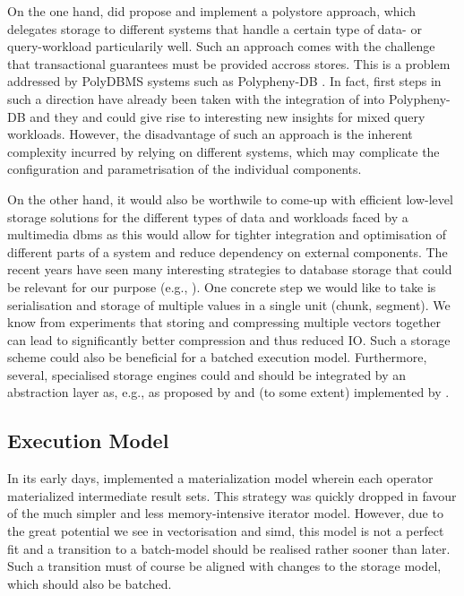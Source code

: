 On the one hand, \cite{Giangreco:2018Database} did propose and implement a polystore approach, which delegates storage to different systems that handle a certain type of data- or query-workload particularily well. Such an approach comes with the challenge that transactional guarantees must be provided accross stores. This is a problem addressed by PolyDBMS systems such as Polypheny-DB \cite{Vogt:2018Polypheny,Vogt:2020Polypheny}. In fact, first steps in such a direction have already been taken with the integration of \cottontail into Polypheny-DB and they and could give rise to interesting new insights for mixed query workloads. However, the disadvantage of such an approach is the inherent complexity incurred by relying on different systems, which may complicate the configuration and parametrisation of the individual components.

On the other hand, it would also be worthwile to come-up with efficient low-level storage solutions for the different types of data and workloads faced by a multimedia \acrshort{dbms} as this would allow for tighter integration and optimisation of different parts of a system and reduce dependency on external components. The recent years have seen many interesting strategies to database storage that could be relevant for our purpose (e.g., \cite{Idreos:2012MonetDB,Sears:2012Blsm}). One concrete step we would like to take is serialisation and storage of multiple values in a single unit (chunk, segment). We know from experiments that storing and compressing multiple vectors together can lead to significantly better compression and thus reduced IO. Such a storage scheme could also be beneficial for a batched execution model. Furthermore, several, specialised storage engines could and should be integrated by an abstraction layer as, e.g., as proposed by \cite{Dittrich:2011Toward,Alagiannis:2014H2O} and (to some extent) implemented by \cottontail{}.


\subsection{Execution Model}
In its early days, \cottontail{} implemented a materialization model wherein each operator materialized intermediate result sets. This strategy was quickly dropped in favour of the much simpler and less memory-intensive iterator model. However, due to the great potential we see in vectorisation and \acrshort{simd}, this model is not a perfect fit and a transition to a batch-model should be realised rather sooner than later. Such a transition must of course be aligned with changes to the storage model, which should also be batched.